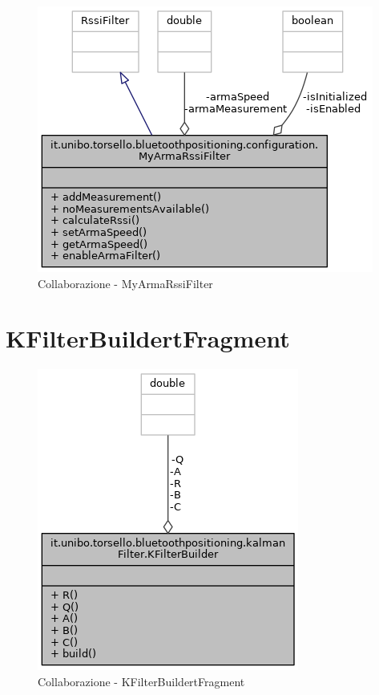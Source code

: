 \begin{figure}[ph]
	\centering
	\includegraphics[width=0.65\linewidth]{img/uml/class/classit_1_1unibo_1_1torsello_1_1bluetoothpositioning_1_1configuration_1_1MyArmaRssiFilter__coll__graph.png}
	\caption{Collaborazione - MyArmaRssiFilter}
\end{figure}

\newpage
\section{KFilterBuildertFragment}
\begin{figure}[ph]
	\centering
	\includegraphics[width=0.6\linewidth]{img/uml/class/classit_1_1unibo_1_1torsello_1_1bluetoothpositioning_1_1kalmanFilter_1_1KFilterBuilder__coll__graph.png}
	\caption{Collaborazione - KFilterBuildertFragment}
\end{figure}

\newpage
